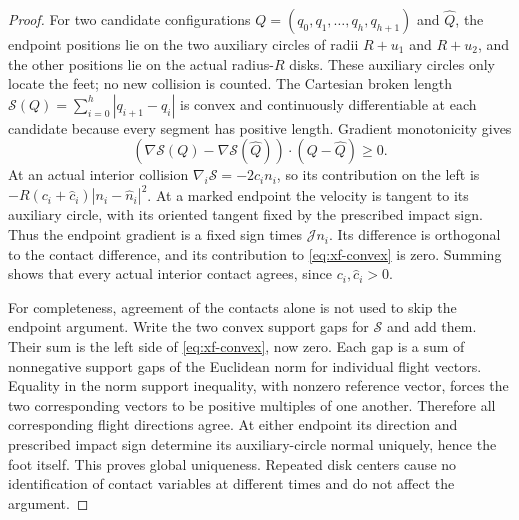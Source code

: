 \begin{proof}
For two candidate configurations
$Q=(q_0,q_1,\ldots,q_h,q_{h+1})$ and $\widehat Q$, the endpoint
positions lie on the two auxiliary circles of radii $R+u_1$ and
$R+u_2$, and the other positions lie on the actual radius-$R$ disks.
These auxiliary circles only locate the feet; no new collision is
counted. The Cartesian broken length
$\mathcal S(Q)=\sum_{i=0}^{h}|q_{i+1}-q_i|$ is convex and
continuously differentiable at each candidate because every segment
has positive length. Gradient monotonicity gives
\begin{equation}\label{eq:xf-convex}
 (\nabla\mathcal S(Q)-\nabla\mathcal S(\widehat Q))
                         \cdot(Q-\widehat Q)\ge0.
\end{equation}
At an actual interior collision
$\nabla_i\mathcal S=-2c_i n_i$, so its contribution on the left is
$-R(c_i+\widehat c_i)|n_i-\widehat n_i|^2$.
At a marked endpoint the velocity is tangent to its auxiliary circle,
with its oriented tangent fixed by the prescribed impact sign.
Thus the endpoint gradient is a fixed sign times $\mathcal Jn_i$.
Its difference is orthogonal to the contact difference, and its
contribution to \eqref{eq:xf-convex} is zero. Summing shows that
every actual interior contact agrees, since $c_i,\widehat c_i>0$.

For completeness, agreement of the contacts alone is not used to
skip the endpoint argument. Write the two convex support gaps for
$\mathcal S$ and add them. Their sum is the left side of
\eqref{eq:xf-convex}, now zero. Each gap is a sum of nonnegative
support gaps of the Euclidean norm for individual flight vectors.
Equality in the norm support inequality, with nonzero reference
vector, forces the two corresponding vectors to be positive
multiples of one another. Therefore all corresponding flight
directions agree. At either endpoint its direction and prescribed
impact sign determine its auxiliary-circle normal uniquely, hence
the foot itself. This proves global uniqueness. Repeated disk centers
cause no identification of contact variables at different times and
do not affect the argument.
\end{proof}


